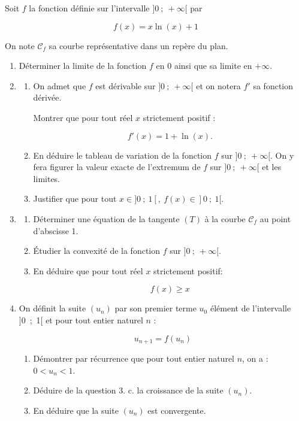 \medskip

Soit $f$ la fonction définie sur l'intervalle $]0~;~ +\infty[$ par 

\[f(x) = x\ln (x) + 1\]

On note $\mathcal{C}_f$ sa courbe représentative dans un repère du plan.

\medskip

\begin{enumerate}
\item Déterminer la limite de la fonction $f$ en $0$ ainsi que sa limite en $+\infty$.
\item 
	\begin{enumerate}
		\item On admet que $f$ est dérivable sur $]0~;~+\infty[$ et on notera $f'$ sa fonction dérivée.
		
Montrer que pour tout réel $x$ strictement positif : 

\[f'(x) = 1 + \ln (x).\]

		\item En déduire le tableau de variation de la fonction $f$ sur $]0~;~ +\infty[$. On y fera figurer la valeur exacte de l'extremum de $f$ sur $]0~;~ +\infty[$ et les limites.
		\item Justifier que pour tout $x \in  ]0~;~1[,\:f(x) \in  ]0~;~1[$.
	\end{enumerate}	
\item 
	\begin{enumerate}
		\item Déterminer une équation de la tangente $(T)$ à la courbe $\mathcal{C}_f$ au point d'abscisse 1.
		\item Étudier la convexité de la fonction $f$ sur $]0~;~+\infty[$.
		\item En déduire que pour tout réel $x$ strictement positif: 
		
		\[f(x) \geqslant x\]
		
	\end{enumerate}
\item On définit la suite $\left(u_n\right)$ par son premier terme $u_0$ élément de l'intervalle ]0~;~1[ et pour tout entier naturel $n$ :

\[u_{n+1} = f\left(u_n\right)\]

	\begin{enumerate}
		\item Démontrer par récurrence que pour tout entier naturel $n$, on a : $0 < u_n < 1$.
		\item Déduire de la question 3. c. la croissance de la suite $\left(u_n\right)$.
		\item En déduire que la suite $\left(u_n\right)$ est convergente.
	\end{enumerate}
\end{enumerate}

\bigskip
